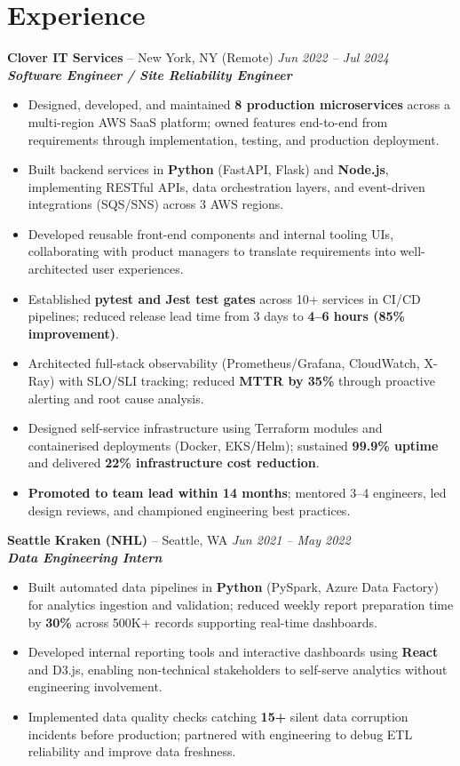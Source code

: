 \documentclass[10pt,a4paper]{article}
\newcommand{\jobentry}[4]{%
  \Needspace{3\baselineskip}%
  \textbf{#1} -- #2 \hfill \textit{#3}\\[-0.15em]
  \textit{#4}\\[-0.25em]
}
\begin{document}
\section*{Experience}
\jobentry{Clover IT Services}{New York, NY (Remote)}{Jun 2022 -- Jul 2024}{\textbf{\textit{Software Engineer / Site Reliability Engineer}}}
\begin{itemize}
  \item Designed, developed, and maintained \textbf{8 production microservices} across a multi-region AWS SaaS platform; owned features end-to-end from requirements through implementation, testing, and production deployment.
  \item Built backend services in \textbf{Python} (FastAPI, Flask) and \textbf{Node.js}, implementing RESTful APIs, data orchestration layers, and event-driven integrations (SQS/SNS) across 3 AWS regions.
  \item Developed reusable front-end components and internal tooling UIs, collaborating with product managers to translate requirements into well-architected user experiences.
  \item Established \textbf{pytest and Jest test gates} across 10+ services in CI/CD pipelines; reduced release lead time from 3 days to \textbf{4--6 hours (85\% improvement)}.
  \item Architected full-stack observability (Prometheus/Grafana, CloudWatch, X-Ray) with SLO/SLI tracking; reduced \textbf{MTTR by 35\%} through proactive alerting and root cause analysis.
  \item Designed self-service infrastructure using Terraform modules and containerised deployments (Docker, EKS/Helm); sustained \textbf{99.9\% uptime} and delivered \textbf{22\% infrastructure cost reduction}.
  \item \textbf{Promoted to team lead within 14 months}; mentored 3--4 engineers, led design reviews, and championed engineering best practices.
\end{itemize}
\jobentry{Seattle Kraken (NHL)}{Seattle, WA}{Jun 2021 -- May 2022}{\textbf{\textit{Data Engineering Intern}}}
\begin{itemize}
  \item Built automated data pipelines in \textbf{Python} (PySpark, Azure Data Factory) for analytics ingestion and validation; reduced weekly report preparation time by \textbf{30\%} across 500K+ records supporting real-time dashboards.
  \item Developed internal reporting tools and interactive dashboards using \textbf{React} and D3.js, enabling non-technical stakeholders to self-serve analytics without engineering involvement.
  \item Implemented data quality checks catching \textbf{15+} silent data corruption incidents before production; partnered with engineering to debug ETL reliability and improve data freshness.
\end{itemize}
\clearpage
\end{document}

